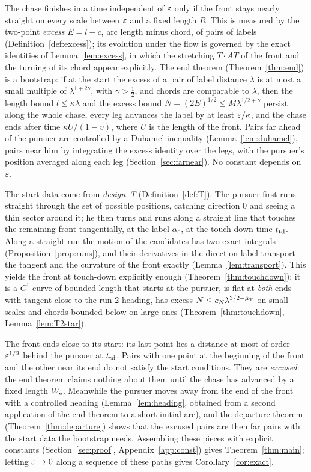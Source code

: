 The chase finishes in a time independent of $\varepsilon$ only if the front stays nearly straight on every scale between $\varepsilon$ and a
fixed length $R$. This is measured by the two-point \emph{excess} $E=l-c$, arc length minus chord, of pairs of labels
(Definition~\ref{def:excess}); its evolution under the flow is governed by the exact identities of Lemma~\ref{lem:excess}, in
which the stretching $T\cdot AT$ of the front and the turning of its chord appear explicitly. The end theorem
(Theorem~\ref{thm:end}) is a bootstrap: if at the start the excess of a pair of label distance $\lambda$ is at most a small
multiple of $\lambda^{1+2\gamma}$, with $\gamma>\frac12$, and chords are comparable to $\lambda$, then the length bound
$l\le\kappa\lambda$ and the excess bound $N=(2E)^{1/2}\le M\lambda^{1/2+\gamma}$ persist along the whole chase, every
leg advances the label by at least $\varepsilon/\kappa$, and the chase ends after time $\kappa U/(1-v)$, where $U$ is the length of
the front. Pairs far ahead of the pursuer are controlled by a Duhamel inequality (Lemma~\ref{lem:duhamel}), pairs near him by
integrating the excess identity over the legs, with the pursuer's position averaged along each leg (Section~\ref{sec:farnear}).
No constant depends on $\varepsilon$.

The start data come from \emph{design~T} (Definition~\ref{def:T}). The pursuer first runs straight through the set of possible
positions, catching direction $0$ and seeing a thin sector around it; he then turns and runs along a straight line that
touches the remaining front tangentially, at the label $\alpha_0$, at the touch-down time $t_{\mathrm{td}}$. Along a straight run the
motion of the candidates has two exact integrals (Proposition~\ref{prop:runs}), and their derivatives in the direction label
transport the tangent and the curvature of the front exactly (Lemma~\ref{lem:transport}). This yields the front at touch-down
explicitly enough (Theorem~\ref{thm:touchdown}): it is a $C^1$ curve of bounded length that starts at the pursuer, is
flat at \emph{both} ends with tangent close to the run-2 heading, has excess $N\le c_N\lambda^{3/2-\bar\mu_{\mathrm T}}$ on small scales and
chords bounded below on large ones (Theorem~\ref{thm:touchdown}, Lemma~\ref{lem:T2star}).

The front ends close to its start: its last point lies a distance at most of order $\varepsilon^{1/2}$ behind the pursuer at $t_{\mathrm{td}}$. Pairs
with one point at the beginning of the front and the other near its end do not satisfy the start conditions. They are
\emph{excused}: the end theorem claims nothing about them until the chase has advanced by a fixed length $W_{\mathrm e}$. Meanwhile the
pursuer moves away from the end of the front with a controlled heading (Lemma~\ref{lem:heading}, obtained from a second
application of the end theorem to a short initial arc), and the departure theorem (Theorem~\ref{thm:departure}) shows that the
excused pairs are then far pairs with the start data the bootstrap needs. Assembling these pieces with explicit constants
(Section~\ref{sec:proof}, Appendix~\ref{app:const}) gives Theorem~\ref{thm:main}; letting $\varepsilon\to0$ along a sequence of these
paths gives Corollary~\ref{cor:exact}.

